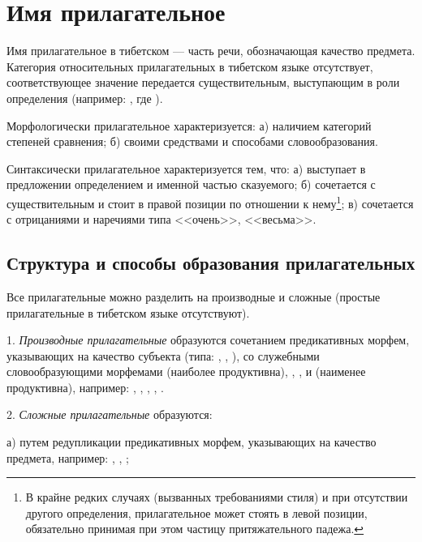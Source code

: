 \section{Имя прилагательное}

Имя прилагательное в тибетском — часть речи, обозначающая качество предмета. Категория относительных прилагательных в тибетском языке отсутствует, соответствующее значение передается существительным, выступающим в роли определения (например: , где ).

Морфологически прилагательное характеризуется: а) наличием категорий степеней сравнения; б) своими средствами и способами словообразования.

Синтаксически прилагательное характеризуется тем, что:
а) выступает в предложении определением и именной частью сказуемого;
б) сочетается с существительным и стоит в правой позиции по отношении к нему\footnote[27]{В крайне редких случаях (вызванных требованиями стиля) и при отсутствии другого определения, прилагательное может стоять в левой позиции, обязательно принимая при этом частицу притяжательного падежа.};
в) сочетается с отрицаниями и наречиями типа <<очень>>, <<весьма>>.

\subsection{Структура и способы образования прилагательных}

Все прилагательные можно разделить на производные и сложные (простые прилагательные в тибетском языке отсутствуют).

1. \emph{Производные прилагательные} образуются сочетанием предикативных морфем, указывающих на качество субъекта (типа: , , ), со служебными словообразующими морфемами  (наиболее продуктивна), , ,  и  (наименее продуктивна), например:
,
,
,
,
.

2. \emph{Сложные прилагательные} образуются:

а) путем редупликации предикативных морфем, указывающих на качество предмета, например:
,
,
;

